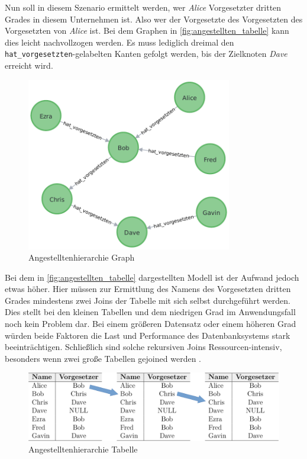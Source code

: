 Nun soll in diesem Szenario ermittelt werden, wer \textit{Alice} Vorgesetzter dritten Grades in diesem Unternehmen ist. Also wer der Vorgesetzte des Vorgesetzten des Vorgesetzten von \textit{Alice} ist. Bei dem Graphen in \autoref{fig:angestellten_tabelle} kann dies leicht nachvollzogen werden. Es muss lediglich dreimal den \texttt{hat\_vorgesetzten}-gelabelten Kanten gefolgt werden, bis der Zielknoten \textit{Dave} erreicht wird. 

\begin{figure}[ht]
    \centering
    \includegraphics[width=0.8\textwidth]{images/angestellten_graph.pdf}
    \caption{Angestelltenhierarchie Graph}
    \label{fig:angestellten_graph}
\end{figure}

Bei dem in \autoref{fig:angestellten_tabelle} dargestellten Modell ist der Aufwand jedoch etwas höher. Hier müssen zur Ermittlung des Namens des Vorgesetzten dritten Grades mindestens zwei Joins der Tabelle mit sich selbst durchgeführt werden. Dies stellt bei den kleinen Tabellen und dem niedrigen Grad im Anwendungsfall noch kein Problem dar. Bei einem größeren Datensatz oder einem höheren Grad würden beide Faktoren die Last und Performance des Datenbanksystems stark beeinträchtigen. Schließlich sind solche rekursiven Joins Ressourcen-intensiv, besonders wenn zwei große Tabellen gejoined werden \cite{gdbms}. 

\begin{figure}[ht]
    \centering
    \includegraphics[width=\textwidth]{images/angestellte_tabellen.pdf}
    \caption{Angestelltenhierarchie Tabelle}
    \label{fig:angestellten_tabelle}
\end{figure}

